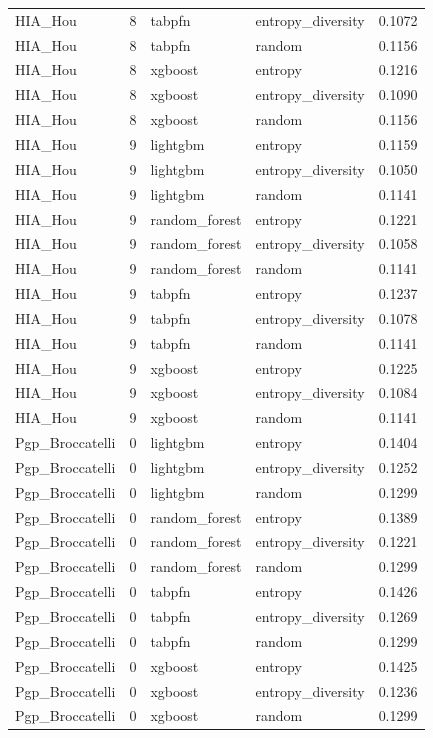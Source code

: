 \begin{tabular}{lrllr}
HIA_Hou & 8 & tabpfn & entropy_diversity & 0.1072 \\
HIA_Hou & 8 & tabpfn & random & 0.1156 \\
HIA_Hou & 8 & xgboost & entropy & 0.1216 \\
HIA_Hou & 8 & xgboost & entropy_diversity & 0.1090 \\
HIA_Hou & 8 & xgboost & random & 0.1156 \\
HIA_Hou & 9 & lightgbm & entropy & 0.1159 \\
HIA_Hou & 9 & lightgbm & entropy_diversity & 0.1050 \\
HIA_Hou & 9 & lightgbm & random & 0.1141 \\
HIA_Hou & 9 & random_forest & entropy & 0.1221 \\
HIA_Hou & 9 & random_forest & entropy_diversity & 0.1058 \\
HIA_Hou & 9 & random_forest & random & 0.1141 \\
HIA_Hou & 9 & tabpfn & entropy & 0.1237 \\
HIA_Hou & 9 & tabpfn & entropy_diversity & 0.1078 \\
HIA_Hou & 9 & tabpfn & random & 0.1141 \\
HIA_Hou & 9 & xgboost & entropy & 0.1225 \\
HIA_Hou & 9 & xgboost & entropy_diversity & 0.1084 \\
HIA_Hou & 9 & xgboost & random & 0.1141 \\
Pgp_Broccatelli & 0 & lightgbm & entropy & 0.1404 \\
Pgp_Broccatelli & 0 & lightgbm & entropy_diversity & 0.1252 \\
Pgp_Broccatelli & 0 & lightgbm & random & 0.1299 \\
Pgp_Broccatelli & 0 & random_forest & entropy & 0.1389 \\
Pgp_Broccatelli & 0 & random_forest & entropy_diversity & 0.1221 \\
Pgp_Broccatelli & 0 & random_forest & random & 0.1299 \\
Pgp_Broccatelli & 0 & tabpfn & entropy & 0.1426 \\
Pgp_Broccatelli & 0 & tabpfn & entropy_diversity & 0.1269 \\
Pgp_Broccatelli & 0 & tabpfn & random & 0.1299 \\
Pgp_Broccatelli & 0 & xgboost & entropy & 0.1425 \\
Pgp_Broccatelli & 0 & xgboost & entropy_diversity & 0.1236 \\
Pgp_Broccatelli & 0 & xgboost & random & 0.1299 \\

\end{tabular}
